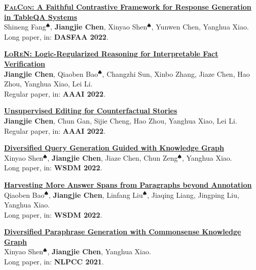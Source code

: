 \documentclass{resume}
\begin{document}
\begin{enumerate}[label={[\arabic*]}]
  
  \item \textbf{\href{https://jiangjiechen.github.io/publication/falcon/}{\textsc{FalCon}: A Faithful Contrastive Framework for Response Generation in TableQA Systems}} \\
  \label{paper:falcon}
  Shineng Fang$^\spadesuit$, \textbf{Jiangjie Chen}, Xinyao Shen$^\spadesuit$, Yunwen Chen, Yanghua Xiao. \\
  Long paper, in: \textbf{DASFAA 2022}.
  
  \item \textbf{\href{https://jiangjiechen.github.io/publication/loren/}{\textsc{LoReN}: Logic-Regularized Reasoning for Interpretable Fact Verification}}\\
  \label{paper:loren}
  \textbf{Jiangjie Chen}, Qiaoben Bao$^\spadesuit$, Changzhi Sun, Xinbo Zhang, Jiaze Chen, Hao Zhou, Yanghua Xiao, Lei Li. \\
  Regular paper, in: \textbf{AAAI 2022}.
  
  \item \textbf{\href{https://jiangjiechen.github.io/publication/educat/}{Unsupervised Editing for Counterfactual Stories}}\\
  \label{paper:educat}
  \textbf{Jiangjie Chen}, Chun Gan, Sijie Cheng, Hao Zhou, Yanghua Xiao, Lei Li. \\
  Regular paper, in: \textbf{AAAI 2022}.
  
  \item \textbf{\href{https://jiangjiechen.github.io/publication/kedy/}{Diversified Query Generation Guided with Knowledge Graph}}\\
  \label{paper:kedy}
  Xinyao Shen$^\spadesuit$, \textbf{Jiangjie Chen}, Jiaze Chen, Chun Zeng$^\spadesuit$, Yanghua Xiao. \\
  Long paper, in: \textbf{WSDM 2022}.
  
  \item \textbf{\href{https://jiangjiechen.github.io/publication/scope/}{Harvesting More Answer Spans from Paragraphs beyond Annotation}}\\
  \label{paper:scope}
  Qiaoben Bao$^\spadesuit$, \textbf{Jiangjie Chen}, Linfang Liu$^\spadesuit$, Jiaqing Liang, Jingping Liu, Yanghua Xiao. \\
  Long paper, in: \textbf{WSDM 2022}.
  
  \item \textbf{\href{https://jiangjiechen.github.io/publication/keep/}{Diversified Paraphrase Generation with Commonsense Knowledge Graph}}\\  
  \label{paper:keep}
  Xinyao Shen$^\spadesuit$, \textbf{Jiangjie Chen}, Yanghua Xiao.\\
  Long paper, in: \textbf{NLPCC 2021}.
  

\end{enumerate}
\end{document}
